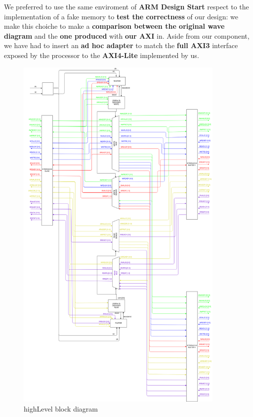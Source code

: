 {}
 We preferred to use the same enviroment of {\bf ARM Design Start} respect to the implementation of a fake memory to {\bf test the correctness} of our design: we make this choiche to make a {\bf comparison between the original wave diagram} and the {\bf one produced} with {\bf our AXI} in. Aside from our component, we have had to insert an {\bf ad hoc adapter} to match the {\bf full AXI3} interface exposed by the processor to the {\bf AXI4-Lite} implemented by us.
\newline

\begin{figure}[h]
  \includegraphics[width=0.9\textwidth, angle=0]{"./../../img/Images/highLevel.png"}
  \caption{highLevel block diagram}
  \label{HLBD}
\end{figure}

